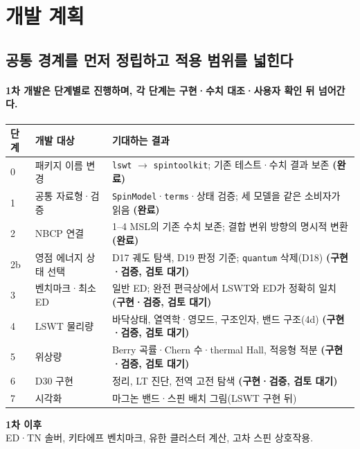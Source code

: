 
\section{개발 계획}



\subsection{공통 경계를 먼저 정립하고 적용 범위를 넓힌다}\label{development-roadmap}
\begingroup%
  \framesubtitle{1차 개발은 단계별로 진행하며, 각 단계는 구현·수치 대조·사용자 확인 뒤 넘어간다.}
  \footnotesize
  \begin{tabularx}{\textwidth}{@{}p{0.8cm}p{3.3cm}Y@{}}
    \toprule
    단계 & 개발 대상 & 기대하는 결과 \\
     & 패키지 이름 변경 & \texttt{lswt} $\to$ \texttt{spintoolkit}; 기존 테스트·수치 결과 보존 \textbf{(완료)} \\
    1 & 공통 자료형·검증 & \texttt{SpinModel}·\texttt{terms}·상태 검증; 세 모델을 같은 소비자가 읽음 \textbf{(완료)} \\
    2 & NBCP 연결 & 1--4 MSL의 기존 수치 보존; 결합 변위 방향의 명시적 변환 \textbf{(완료)} \\
    2b & 영점 에너지 상태 선택 & D17 궤도 탐색, D19 판정 기준; \texttt{quantum} 삭제(D18) \textbf{(구현·검증, 검토 대기)} \\
    3 & 벤치마크·최소 ED & 일반 ED; 완전 편극상에서 LSWT와 ED가 정확히 일치 \textbf{(구현·검증, 검토 대기)} \\
    4 & LSWT 물리량 & 바닥상태, 열역학·영모드, 구조인자, 밴드 구조(4d) \textbf{(구현·검증, 검토 대기)} \\
    5 & 위상량 & Berry 곡률·Chern 수·thermal Hall, 적응형 적분 \textbf{(구현·검증, 검토 대기)} \\
    6 & D30 구현 & 정리, LT 진단, 전역 고전 탐색 \textbf{(구현·검증, 검토 대기)} \\
    7 & 시각화 & 마그논 밴드·스핀 배치 그림(LSWT 구현 뒤) \\
    \bottomrule
  \end{tabularx}
  \par\medskip
  \textbf{1차 이후}\\[0.4em]
  ED·TN 솔버, 키타에프 벤치마크, 유한 클러스터 계산, 고차 스핀 상호작용.\\[0.4em]
\endgroup


